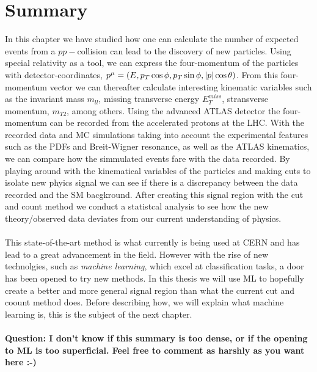 \documentclass[12pt, a4paper]{book}
\begin{document}
\section{Summary}
In this chapter we have studied how one can calculate the number of expected events from a $pp-$collision can lead to the discovery of new particles. Using special relativity as a tool, we can express the four-momentum of the particles with 
detector-coordinates, $p^\mu=(E,p_T\cos\phi,p_T\sin\phi,\abs{p}\cos\theta)$. From this four-momentum vector we can thereafter calculate interesting kinematic variables such as the invariant mass $m_{ll}$, missing transverse energy $E_T^{miss}$, 
stransverse momentum, $m_{T2}$, among others. Using the advanced ATLAS detector the four-momentum can be recorded from the accelerated protons at the LHC. With the recorded data and MC simulations taking into account the experimental features such as 
the PDFs and Breit-Wigner resonance, as well as the ATLAS kinematics, we can compare how the simmulated events fare with the data recorded. By playing around with the kinematical variables of the particles and making cuts to isolate new phyics signal 
we can see if there is a discrepancy between the data recorded and the SM bacgkround. After creating this signal region with the cut and count method we conduct a statistcal analysis to see how the new theory/observed data deviates from our 
current understanding of physics.\\
\\This state-of-the-art method is what currently is being used at CERN and has lead to a great advancement in the field. However with the rise of new technolgies, such as \textit{machine learning}, which excel at classification tasks, a door has been 
opened to try new methods. In this thesis we will use ML to hopefully create a better and more general signal region than what the current cut and coount method does. Before describing how, we will explain what machine learning is, this is the subject 
of the next chapter.\\
\\\textbf{ Question: I don't know if this summary is too dense, or if the opening to ML is too superficial. Feel free to comment as harshly as you want here :-)}
\end{document}
